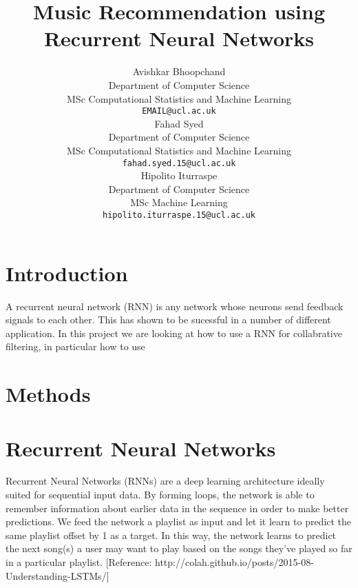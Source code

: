 \documentclass{article} %
\title{Music Recommendation using Recurrent Neural Networks}
\author{
Avishkar Bhoopchand\\
Department of Computer Science\\
MSc Computational Statistics and Machine Learning\\
\texttt{EMAIL@ucl.ac.uk} \\
\And
Fahad Syed\\
Department of Computer Science\\
MSc Computational Statistics and Machine Learning\\
\texttt{fahad.syed.15@ucl.ac.uk} \\
\And
Hipolito Iturraspe\\
Department of Computer Science\\
MSc Machine Learning\\
\texttt{hipolito.iturraspe.15@ucl.ac.uk} \\
}
\begin{document}
\maketitle
\clearpage

\section{Introduction}
A recurrent neural network (RNN) is any network whose neurons send feedback signals to each other. This has shown to be sucessful in a number of different application. In this project we are looking at how to use a RNN for collabrative filtering, in particular how to use 


%



\section{Methods}
\section{Recurrent Neural Networks}
Recurrent Neural Networks (RNNs) are a deep learning architecture ideally suited for sequential input data. By forming loops, the network is able to remember information about earlier data in the sequence in order to make better predictions. We feed the network a playlist as input and let it learn to predict the same playlist offset by 1 as a target. In this way, the network learns to predict the next song(s) a user may want to play based on the songs they've played so far in a particular playlist. [Reference: http://colah.github.io/posts/2015-08-Understanding-LSTMs/]
\end{document}
